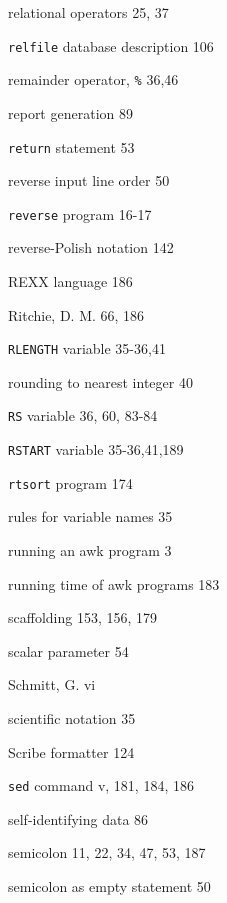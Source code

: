 \begin{multicols}{3}
\hangindent=3pc  relational operators 25, 37

\hangindent=3pc  \verb'relfile' database description 106

\hangindent=3pc  remainder operator, \verb'%' 36,46

\hangindent=3pc  report generation 89

\hangindent=3pc  \verb'return' statement 53

\hangindent=3pc  reverse input line order 50

\hangindent=3pc  \verb'reverse' program 16-17

\hangindent=3pc  reverse-Polish notation 142

\hangindent=3pc  REXX language 186

\hangindent=3pc  Ritchie, D. M. 66, 186

\hangindent=3pc  \verb'RLENGTH' variable 35-36,41

\hangindent=3pc  rounding to nearest integer 40

\hangindent=3pc  \verb'RS' variable 36, 60, 83-84

\hangindent=3pc  \verb'RSTART' variable 35-36,41,189

\hangindent=3pc  \verb'rtsort' program 174

\hangindent=3pc  rules for variable names 35

\hangindent=3pc  running an awk program 3

\hangindent=3pc  running time of awk programs 183

\hangindent=3pc  scaffolding 153, 156, 179

\hangindent=3pc  scalar parameter 54

\hangindent=3pc  Schmitt, G. vi

\hangindent=3pc  scientific notation 35

\hangindent=3pc  Scribe formatter 124

\hangindent=3pc  \verb'sed' command v, 181, 184, 186

\hangindent=3pc  self-identifying data 86

\hangindent=3pc  semicolon 11, 22, 34, 47, 53, 187

\hangindent=3pc  semicolon as empty statement 50


\end{multicols}
